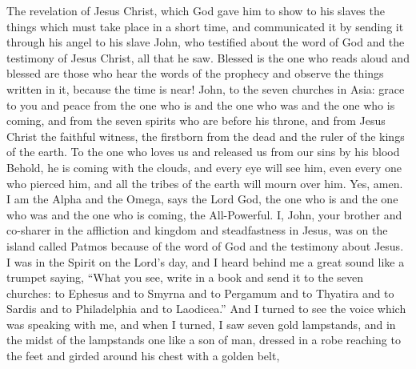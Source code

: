 
\begin{biblechapter} %
 The revelation of Jesus Christ, which God gave him to show to his slaves the things which must take place in a short time, and communicated it by sending it through his angel to his slave John,
\verse who testified about the word of God and the testimony of Jesus Christ, all that he saw.
\verse Blessed is the one who reads aloud and blessed are those who hear the words of the prophecy and observe the things written in it, because the time is near!
 John, to the seven churches in Asia: grace to you and peace from the one who is and the one who was and the one who is coming, and from the seven spirits who are before his throne,
\verse and from Jesus Christ the faithful witness, the firstborn from the dead and the ruler of the kings of the earth.
\verse To the one who loves us and released us from our sins by his blood
\verse Behold, he is coming with the clouds, 
and every eye will see him, 
even every one who pierced him, 
and all the tribes of the earth will mourn over him. Yes, amen.
\verse I am the Alpha and the Omega, says the Lord God, the one who is and the one who was and the one who is coming, the All-Powerful.
 I, John, your brother and co-sharer in the affliction and kingdom and steadfastness in Jesus, was on the island called Patmos because of the word of God and the testimony about Jesus.
\verse I was in the Spirit on the Lord’s day, and I heard behind me a great sound like a trumpet
\verse saying, “What you see, write in a book and send it to the seven churches: to Ephesus and to Smyrna and to Pergamum and to Thyatira and to Sardis and to Philadelphia and to Laodicea.”
\verse And I turned to see the voice which was speaking with me, and when I turned, I saw seven gold lampstands,
\verse and in the midst of the lampstands one like a son of man, dressed in a robe reaching to the feet and girded around his chest with a golden belt,

\end{biblechapter}
